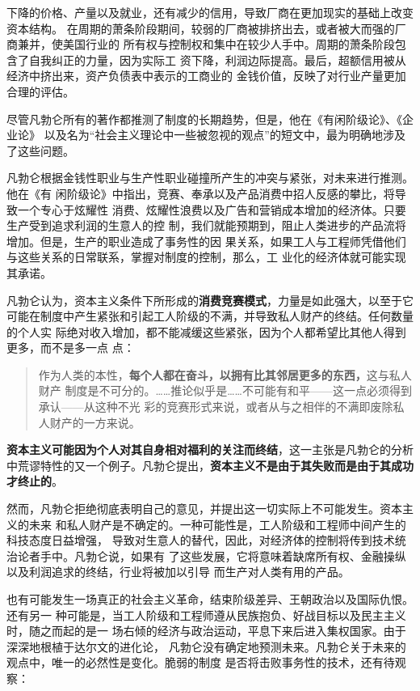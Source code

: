 下降的价格、产量以及就业，还有减少的信用，导致厂商在更加现实的基础上改变资本结构。
在周期的萧条阶段期间，较弱的厂商被排挤出去，或者被大而强的厂商兼并，使美国行业的
所有权与控制权和集中在较少人手中。周期的萧条阶段包含了自我纠正的力量，因为实际工
资下降，利润边际提高。最后，超额信用被从经济中挤出来，资产负债表中表示的工商业的
金钱价值，反映了对行业产量更加合理的评估。

尽管凡勃仑所有的著作都推测了制度的长期趋势，但是，他在《有闲阶级论》、《企业论》
以及名为“社会主义理论中一些被忽视的观点”的短文中，最为明确地涉及了这些问题。

凡勃仑根据金钱性职业与生产性职业碰撞所产生的冲突与紧张，对未来进行推测。他在《有
闲阶级论》中指出，竞赛、奉承以及产品消费中招人反感的攀比，将导致一个专心于炫耀性
消费、炫耀性浪费以及广告和营销成本增加的经济体。只要生产受到追求利润的生意人的控
制，我们就能预期到，阻止人类进步的产品流将增加。但是，生产的职业造成了事务性的因
果关系，如果工人与工程师凭借他们与这些关系的日常联系，掌握对制度的控制，那么，工
业化的经济体就可能实现其承诺。

凡勃仑认为，资本主义条件下所形成的\textbf{消费竞赛模式}，力量是如此强大，以至于它
可能在制度中产生紧张和引起工人阶级的不满，并导致私人财产的终结。任何数量的个人实
际绝对收入增加，都不能减缓这些紧张，因为个人都希望比其他人得到更多，而不是多一点
点：
\begin{quotation}
  作为人类的本性，\textbf{每个人都在奋斗，以拥有比其邻居更多的东西，}这与私人财产
  制度是不可分的。……推论似乎是……不可能有和平——这一点必须得到承认——从这种不光
  彩的竞赛形式来说，或者从与之相伴的不满即废除私人财产的一方来说。
\end{quotation}

\textbf{资本主义可能因为个人对其自身相对福利的关注而终结}，这一主张是凡勃仑的分析
中荒谬特性的又一个例子。凡勃仑提出，\textbf{资本主义不是由于其失败而是由于其成功
  才终止的}。

然而，凡勃仑拒绝彻底表明自己的意见，并提出这一切实际上不可能发生。资本主义的未来
和私人财产是不确定的。一种可能性是，工人阶级和工程师中间产生的科技态度日益增强，
导致对生意人的替代，因此，对经济体的控制将传到技术统治论者手中。凡勃仑说，如果有
了这些发展，它将意味着缺席所有权、金融操纵以及利润追求的终结，行业将被加以引导
而生产对人类有用的产品。

也有可能发生一场真正的社会主义革命，结束阶级差异、王朝政治以及国际仇恨。还有另一
种可能是，当工人阶级和工程师遵从民族抱负、好战目标以及民主主义时，随之而起的是一
场右倾的经济与政治运动，平息下来后进入集权国家。由于深深地根植于达尔文的进化论，
凡勃仑没有确定地预测未来。凡勃仑关于未来的观点中，唯一的必然性是变化。脆弱的制度
是否将击败事务性的技术，还有待观察：

